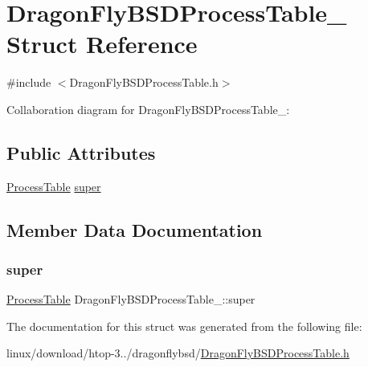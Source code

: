 \hypertarget{structDragonFlyBSDProcessTable__}{}\section{Dragon\+Fly\+B\+S\+D\+Process\+Table\+\_\+ Struct Reference}
\label{structDragonFlyBSDProcessTable__}


{\ttfamily \#include $<$Dragon\+Fly\+B\+S\+D\+Process\+Table.\+h$>$}



Collaboration diagram for Dragon\+Fly\+B\+S\+D\+Process\+Table\+\_\+\+:
\subsection*{Public Attributes}
\begin{DoxyCompactItemize}
\item 
\hyperlink{ProcessTable_8h_a54ec62da6f9d80d4d06e3845a2597a80}{Process\+Table} \hyperlink{structDragonFlyBSDProcessTable___a760dea7b60325d0fefa1f7801e629c3c}{super}
\end{DoxyCompactItemize}


\subsection{Member Data Documentation}
\mbox{\label{structDragonFlyBSDProcessTable___a760dea7b60325d0fefa1f7801e629c3c}} 
\subsubsection{\texorpdfstring{super}{super}}
{\footnotesize\ttfamily \hyperlink{ProcessTable_8h_a54ec62da6f9d80d4d06e3845a2597a80}{Process\+Table} Dragon\+Fly\+B\+S\+D\+Process\+Table\+\_\+\+::super}



The documentation for this struct was generated from the following file\+:\begin{DoxyCompactItemize}
\item 
linux/download/htop-\/3../dragonflybsd/\hyperlink{DragonFlyBSDProcessTable_8h}{Dragon\+Fly\+B\+S\+D\+Process\+Table.\+h}\end{DoxyCompactItemize}
